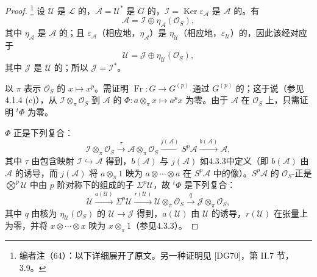 \begin{proof}
\footnote{编者注（64）：以下详细展开了原文。另一种证明见 [DG70]，第 II.7 节，3.9。}
设 $\mathcal U$ 是 $\mathcal L$ 的，$\mathcal A=\mathcal U^*$ 是 $G$ 的，$\mathcal I=\operatorname{Ker}\varepsilon_{\mathcal A}$ 是 $\mathcal A$ 的。有
\[
 \mathcal A=\mathcal I\oplus\eta_{\mathcal A}(\mathcal O_S),\tag{1}
\]
其中 $\eta_{\mathcal A}$ 是 $\mathcal A$ 的；且 $\varepsilon_{\mathcal A}$（相应地，$\eta_{\mathcal A}$）是 $\eta_{\mathcal U}$（相应地，$\varepsilon_{\mathcal U}$）的，因此该经对应于
\[
 \mathcal U=\mathcal J\oplus\eta_{\mathcal U}(\mathcal O_S),\tag{2}
\]
其中 $\mathcal J$ 是 $\mathcal U$ 的；所以 $\mathcal J=\mathcal I^*$。

以 $\pi$ 表示 $\mathcal O_S$ 的 $x\mapsto x^p$。需证明 $\operatorname{Fr}:G\to G^{(p)}$ 通过 $G^{(p)}$ 的；这于说（参见4.1.4 (c)），从 $\mathcal I\otimes_\pi\mathcal O_S$ 到 $\mathcal A$ 的 $\Phi:a\otimes_\pi x\mapsto a^px$ 为零。由于 $\mathcal A$ 在 $\mathcal O_S$ 上，只需证明 ${}^t\Phi$ 为零。

$\Phi$ 正是下列复合：
\[
 \mathcal I\otimes_\pi\mathcal O_S\xrightarrow{\tau}\mathcal A\otimes_\pi\mathcal O_S
 \xrightarrow{j(\mathcal A)}S^p\mathcal A\xrightarrow{b(\mathcal A)}\mathcal A,
\]
其中 $\tau$ 由包含映射 $\mathcal I\hookrightarrow\mathcal A$ 得到，$b(\mathcal A)$ 与 $j(\mathcal A)$ 如4.3.3中定义（即 $b(\mathcal A)$ 由 $\mathcal A$ 的诱导，而 $j(\mathcal A)$ 将 $a\otimes_\pi1$ 映为 $a\otimes\cdots\otimes a$ 在 $S^p\mathcal A$ 中的像）。$S^p\mathcal A$ 的 $\mathcal O_S$-正是 $\bigotimes^p\mathcal U$ 中由 $p$ 阶对称下的组成的子 $\Sigma^p\mathcal U$，故 ${}^t\Phi$ 是下列复合：
\[
 \mathcal U\xrightarrow{a(\mathcal U)}\Sigma^p\mathcal U
 \xrightarrow{r(\mathcal U)}\mathcal U\otimes_\pi\mathcal O_S
 \xrightarrow{q}\mathcal J\otimes_\pi\mathcal O_S,
\]
其中 $q$ 由核为 $\eta_{\mathcal U}(\mathcal O_S)$ 的 $\mathcal U\to\mathcal J$ 得到，$a(\mathcal U)$ 由 $\mathcal U$ 的诱导，$r(\mathcal U)$ 在张量上为零，并将 $x\otimes\cdots\otimes x$ 映为 $x\otimes_\pi1$（参见4.3.3）。


\end{proof}
